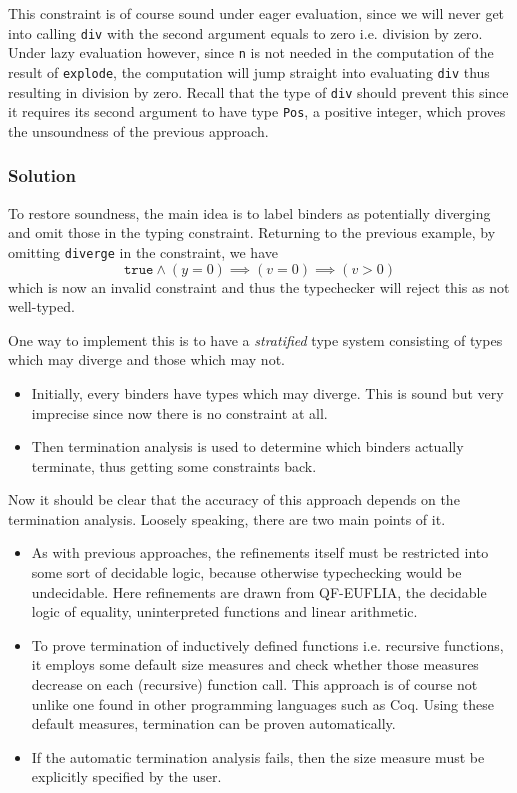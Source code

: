 \documentclass[a4paper,UKenglish]{lipics-v2016}
\begin{document}
      This constraint is of course sound under eager evaluation, since we will
      never get into calling \texttt{div} with the second argument equals to
      zero i.e. division by zero.  Under lazy evaluation however, since
      \texttt{n} is not needed in the computation of the result of
      \texttt{explode}, the computation will jump straight into evaluating
      \texttt{div} thus resulting in division by zero.  Recall that the type of
      \texttt{div} should prevent this since it requires its second argument to
      have type \texttt{Pos}, a positive integer, which proves the unsoundness
      of the previous approach.

    \subsubsection{Solution}
      
      To restore soundness, the main idea is to label binders as potentially
      diverging and omit those in the typing constraint.  Returning to the
      previous example, by omitting \texttt{diverge} in the constraint, we have
      $$\mathtt{true}\wedge(y=0)\implies(v=0)\implies(v>0)$$
      which is now an invalid constraint and thus the typechecker will reject
      this as not well-typed.

      One way to implement this is to have a \emph{stratified} type system
      consisting of types which may diverge and those which may not.
      \begin{itemize}
        \item Initially, every binders have types which may diverge.  This is
          sound but very imprecise since now there is no constraint at all.
        \item Then termination analysis is used to determine which binders
          actually terminate, thus getting some constraints back.
      \end{itemize}

      Now it should be clear that the accuracy of this approach depends on the
      termination analysis.  Loosely speaking, there are two main points of it.
      \begin{itemize}
        \item As with previous approaches, the refinements itself must be
          restricted into some sort of decidable logic, because otherwise
          typechecking would be undecidable.  Here refinements are drawn from
          QF-EUFLIA, the decidable logic of equality, uninterpreted
          functions and linear arithmetic.
        \item To prove termination of inductively defined functions i.e.
          recursive functions, it employs some default size measures and check
          whether those measures decrease on each (recursive) function call.
          This approach is of course not unlike one found in other programming
          languages such as Coq. Using these default measures, termination can
          be proven automatically.
        \item If the automatic termination analysis fails, then the size
          measure must be explicitly specified by the user.
      \end{itemize}
\end{document}
